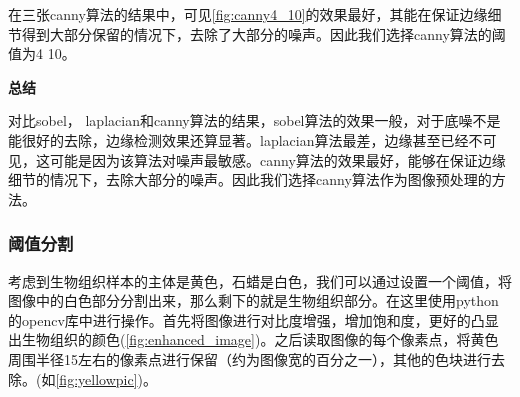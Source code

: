 在三张canny算法的结果中，可见\autoref{fig:canny4_10}的效果最好，其能在保证边缘细节得到大部分保留的情况下，去除了大部分的噪声。因此我们选择canny算法的阈值为4 10。

\textbf{总结}

对比sobel， laplacian和canny算法的结果，sobel算法的效果一般，对于底噪不是能很好的去除，边缘检测效果还算显著。laplacian算法最差，边缘甚至已经不可见，这可能是因为该算法对噪声最敏感。canny算法的效果最好，能够在保证边缘细节的情况下，去除大部分的噪声。因此我们选择canny算法作为图像预处理的方法。

\FloatBarrier


\subsubsection{阈值分割}

考虑到生物组织样本的主体是黄色，石蜡是白色，我们可以通过设置一个阈值，将图像中的白色部分分割出来，那么剩下的就是生物组织部分。在这里使用python的opencv库中进行操作。首先将图像进行对比度增强，增加饱和度，更好的凸显出生物组织的颜色(\autoref{fig:enhanced_image})。之后读取图像的每个像素点，将黄色周围半径15左右的像素点进行保留（约为图像宽的百分之一），其他的色块进行去除。(如\autoref{fig:yellowpic})。

